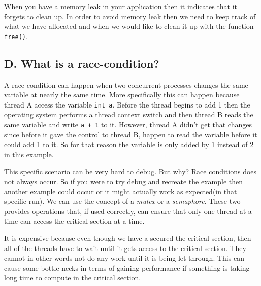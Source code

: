 \documentclass[11pt]{article}
\newcommand{\code}[1]{{\colorbox{lightgray!15}{\color{black}\texttt{#1}}}}
\begin{document}
When you have a memory leak in your application then it indicates that it forgets to clean up.
In order to avoid memory leak then we need to keep track of what we have allocated and when we would like to clean it up with the function \code{free()}.

\subsection{D. What is a race-condition?}
A race condition can happen when two concurrent processes changes the same variable at nearly the same time. 
More specifically this can happen because thread A access the variable \code{int a}. Before the thread begins to add 1 then the operating system performs a thread context switch and then thread B reads the same variable and write \code{a + 1} to it.
However, thread A didn't get that changes since before it gave the control to thread B, happen to read the variable before it could add 1 to it. So for that reason the variable is only added by 1 instead of 2 in this example.

This specific scenario can be very hard to debug. But why? Race conditions does not always occur. So if you were to try debug and recreate the example then another example could occur or it might actually work as expected(in that specific run).
We can use the concept of a \textit{mutex} or a \textit{semaphore}. These two provides operations that, if used correctly, can ensure that 
only one thread at a time can access the critical section at a time. 

It is expensive because even though we have a secured the critical section, then all of the threads have to wait until it gets access to
the critical section. They cannot in other words not do any work until it is being let through. This can cause some bottle necks in terms of 
gaining performance if something is taking long time to compute in the critical section.

\newpage
\printbibliography

\newpage

\end{document}

